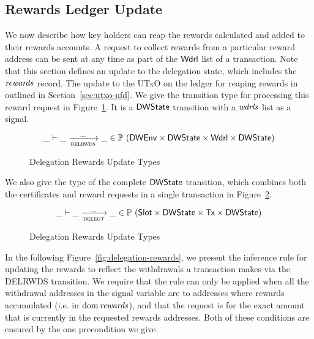 \documentclass[11pt,a4paper,dvipsnames]{article}
\newcommand{\Tx}{\type{Tx}}
\newcommand{\Wdrl}{\type{Wdrl}}
\newcommand{\Slot}{\type{Slot}}
\newcommand{\DWState}{\type{DWState}}
\newcommand{\DWEnv}{\type{DWEnv}}
\theoremstyle{definition}
\theoremstyle{definition}
\begin{document}
\clearpage

\subsection{Rewards Ledger Update}
\label{sec:utxo-rewards}

We now describe how key holders can reap the rewards calculated and added to
their rewards accounts. A request to collect rewards from a particular reward
address can be sent at any time as part of the $\Wdrl$ list of a transaction.
Note that this section defines an update to the delegation state, which includes
the $\mathit{rewards}$ record. The update to the UTxO on the ledger for reaping
rewards in outlined in Section~\ref{sec:utxo-ufd}.
We give the transition type for processing this reward request in
Figure~\ref{fig:delegation-rewards-type}. It is a $\DWState$ transition with a
$\mathit{wdrls}$ list as a signal.

\begin{figure}
\begin{equation*} \label{eq:rewards-upd}
  \_ \vdash \_ \trans{delrwds}{\_} \_ \in
    \powerset (\DWEnv \times \DWState \times \Wdrl \times \DWState)
\end{equation*}
\caption{Delegation Rewards Update Types}
\label{fig:delegation-rewards-type}
\end{figure}


We also give the type of the complete $\DWState$
transition, which combines both the certificates and reward
requests in a single transaction in Figure~\ref{fig:delegation-total-type}.

\begin{figure}
\begin{equation*} \label{eq:dstate-total}
  \_ \vdash \_ \trans{delegt}{\_} \_ \in
    \powerset (\Slot \times \DWState \times \Tx \times \DWState)
\end{equation*}

\caption{Delegation Rewards Update Types}
\label{fig:delegation-total-type}
\end{figure}


In the following Figure~\ref{fig:delegation-rewards}, we present the inference
rule for updating the rewards to reflect the withdrawals a transaction makes
via the DELRWDS transition. We require that the rule can only be applied when
all the withdrawal addresses in the signal variable
are to addresses where rewards accumulated (i.e. in $\operatorname{dom} \mathit{rewards}$), and
that the request is for the exact amount that is currently in the requested
rewards addresses. Both of these conditions are ensured by the one
precondition we give.
\end{document}
